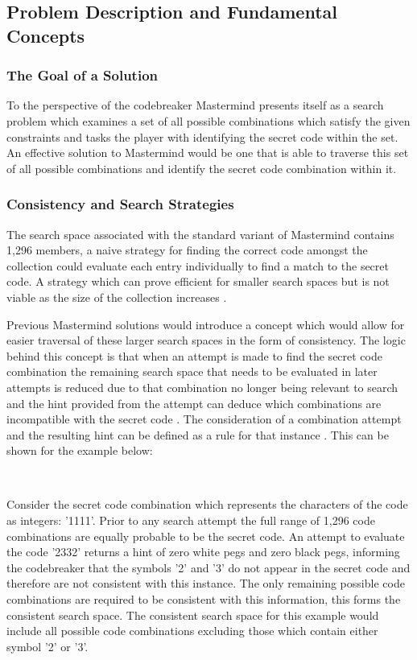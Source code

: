 \documentclass[11pt]{article}  %
\theoremstyle{definition}
\theoremstyle{remark}
\begin{document}
\subsection {Problem Description and Fundamental Concepts}

\subsubsection {The Goal of a Solution}
To the perspective of the codebreaker Mastermind presents itself as a search problem which examines a set of all possible combinations which satisfy the given constraints and tasks the player with identifying the secret code within the set. An effective solution to Mastermind would be one that is able to traverse this set of all possible combinations and identify the secret code combination within it.

\subsubsection {Consistency and Search Strategies}

The search space associated with the standard variant of Mastermind contains 1,296 members, a naive strategy for finding the correct code amongst the collection could evaluate each entry individually to find a match to the secret code. A strategy which can prove efficient for smaller search spaces but is not viable as the size of the collection increases \cite{Two Peg}.

Previous Mastermind solutions would introduce a concept which would allow for easier traversal of these larger search spaces in the form of consistency. The logic behind this concept is that when an attempt is made to find the secret code combination the remaining search space that needs to be evaluated in later attempts is reduced due to that combination no longer being relevant to search and the hint provided from the attempt can deduce which combinations are incompatible with the secret code \cite {Merelo}. The consideration of a combination attempt and the resulting hint can be defined as a rule for that instance \cite {Haystack}. This can be shown for the example below:

\

Consider the secret code combination which represents the characters of the code as integers: '1111'. Prior to any search attempt the full range of 1,296 code combinations are equally probable to be the secret code. An attempt to evaluate the code '2332' returns a hint of zero white pegs and zero black pegs, informing the codebreaker that the symbols '2' and '3' do not appear in the secret code and therefore are not consistent with this instance. The only remaining possible code combinations are required to be consistent with this information, this forms the consistent search space. The consistent search space for this example would include all possible code combinations excluding those which contain either symbol '2' or '3'.
\end{document}
